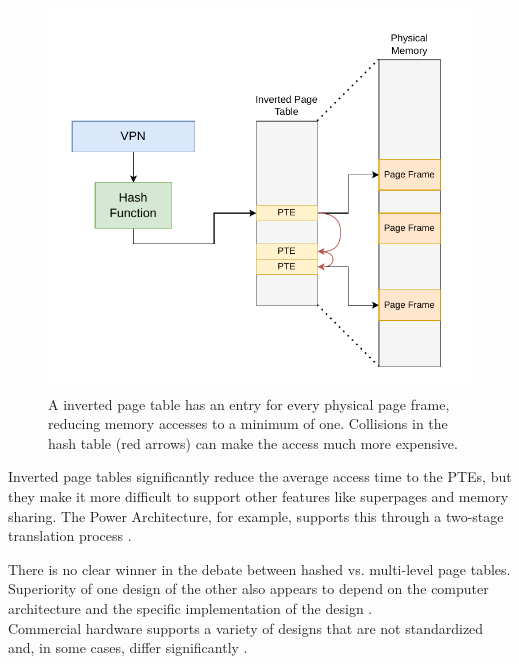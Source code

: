 \begin{figure}[t]
    \centering
    \includegraphics[scale=1]{figures/inverted_pt.pdf}
    \caption[Simple Inverted Page Table Design]{A inverted page table has an entry for every physical
        page frame, reducing memory accesses to a minimum of one. Collisions in the hash table (red arrows) can
        make the access much more expensive. }
    \label{fig:fund:inverted}
\end{figure}


Inverted page tables significantly reduce the average access time to the PTEs, but they make it
more difficult to support other features like superpages and memory sharing.
The Power Architecture, for example, supports this through a two-stage translation process \cite{yaniv2016hash}.


There is no clear winner in the debate between hashed vs. multi-level page tables.\\
Superiority of one design of the other also appears to depend on the computer architecture \cite{barrTranslationCachingSkip}
and the specific implementation of the design \cite{yaniv2016hash}.\\
Commercial hardware supports a variety of designs that are not standardized and, in some cases,
differ significantly \cite{jacob1998look}.


